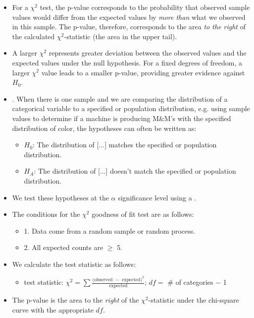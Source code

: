 \begin{itemize}
\item For a $\chi^2$ test, the p-value corresponds to the probability that observed sample values would differ from the expected values by \textit{more than} what we observed in this sample.  The p-value, therefore, corresponds to the area \textit{to the right} of the calculated $\chi^2$-statistic (the area in the upper tail). 
\item A larger $\chi^2$ represents greater deviation between the observed values and the expected values under the null hypothesis.  For a fixed degrees of freedom, a larger $\chi^2$ value leads to a smaller p-value, providing greater evidence against $H_0$. 

\item {}.  When there is one sample and we are comparing the distribution of a categorical variable to a specified or population distribution, e.g. using sample values to determine if a machine is producing M\&M's with the specified distribution of color, the hypotheses can often be written as:
\begin{itemize}
\item[] $H_0$: The distribution of [...] matches the specified or population distribution. 
\item[] $H_A$: The distribution of [...] doesn't match the specified or population distribution. 
\end{itemize}

\item[] We test these hypotheses at the $\alpha$ significance level using a .\\
\item The conditions for the $\chi^2$ goodness of fit test are as follows:
\begin{itemize}
\item[] 1.  Data come from a random sample or random process.
\item[] 2.  All expected counts are $\ge$ 5.
\end{itemize}
\item We calculate the test statistic as follows:
\begin{itemize}
\item[] test statistic:  $\chi^2 =\sum{ \frac{\text{(observed } - \text{ expected})^2}{\text{expected}}}$; \quad \quad $df =$ \# of categories $-$ 1
\end{itemize}
\item The p-value is the area to the \emph{right} of the $\chi^2$-statistic under the chi-square curve with the appropriate $df$.

\end{itemize}


